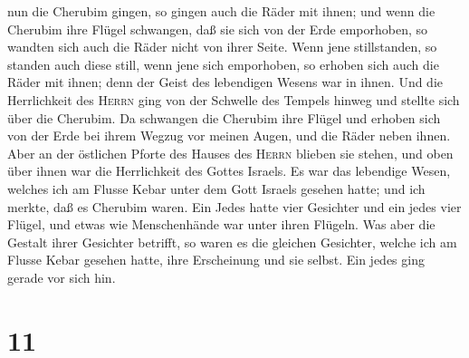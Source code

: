 nun die Cherubim gingen, so gingen auch die Räder mit ihnen; und wenn
die Cherubim ihre Flügel schwangen, daß sie sich von der Erde
emporhoben, so wandten sich auch die Räder nicht von ihrer Seite.
 Wenn jene stillstanden, so standen auch diese still,
wenn jene sich emporhoben, so erhoben sich auch die Räder mit ihnen;
denn der Geist des lebendigen Wesens war in ihnen.  Und
die Herrlichkeit des \textsc{Herrn} ging von der Schwelle des Tempels
hinweg und stellte sich über die Cherubim.  Da schwangen
die Cherubim ihre Flügel und erhoben sich von der Erde bei ihrem Wegzug
vor meinen Augen, und die Räder neben ihnen. Aber an der östlichen
Pforte des Hauses des \textsc{Herrn} blieben sie stehen, und oben über
ihnen war die Herrlichkeit des Gottes Israels.  Es war
das lebendige Wesen, welches ich am Flusse Kebar unter dem Gott Israels
gesehen hatte; und ich merkte, daß es Cherubim waren. 
Ein Jedes hatte vier Gesichter und ein jedes vier Flügel, und etwas wie
Menschenhände war unter ihren Flügeln.  Was aber die
Gestalt ihrer Gesichter betrifft, so waren es die gleichen Gesichter,
welche ich am Flusse Kebar gesehen hatte, ihre Erscheinung und sie
selbst. Ein jedes ging gerade vor sich hin.

\hypertarget{section-10}{%
\section{11}\label{section-10}}

